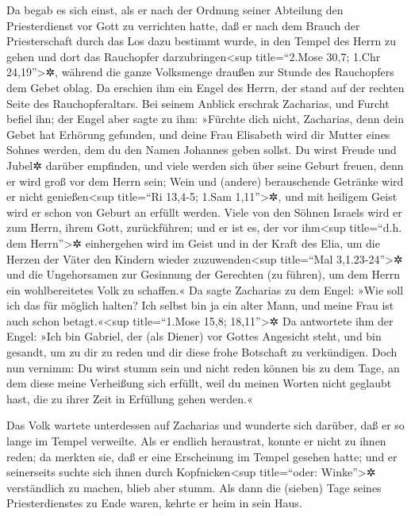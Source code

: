  Da begab es sich einst, als er nach der Ordnung seiner
Abteilung den Priesterdienst vor Gott zu verrichten hatte,
 daß er nach dem Brauch der Priesterschaft durch das Los
dazu bestimmt wurde, in den Tempel des Herrn zu gehen und dort das
Rauchopfer darzubringen\textless sup title=``2.Mose 30,7; 1.Chr
24,19''\textgreater✲,  während die ganze Volksmenge
draußen zur Stunde des Rauchopfers dem Gebet oblag.  Da
erschien ihm ein Engel des Herrn, der stand auf der rechten Seite des
Rauchopferaltars.  Bei seinem Anblick erschrak Zacharias,
und Furcht befiel ihn;  der Engel aber sagte zu ihm:
»Fürchte dich nicht, Zacharias, denn dein Gebet hat Erhörung gefunden,
und deine Frau Elisabeth wird dir Mutter eines Sohnes werden, dem du den
Namen Johannes geben sollst.  Du wirst Freude und Jubel✲
darüber empfinden, und viele werden sich über seine Geburt freuen,
 denn er wird groß vor dem Herrn sein; Wein und (andere)
berauschende Getränke wird er nicht genießen\textless sup title=``Ri
13,4-5; 1.Sam 1,11''\textgreater✲, und mit heiligem Geist wird er schon
von Geburt an erfüllt werden.  Viele von den Söhnen
Israels wird er zum Herrn, ihrem Gott, zurückführen;  und
er ist es, der vor ihm\textless sup title=``d.h. dem
Herrn''\textgreater✲ einhergehen wird im Geist und in der Kraft des
Elia, um die Herzen der Väter den Kindern wieder zuzuwenden\textless sup
title=``Mal 3,1.23-24''\textgreater✲ und die Ungehorsamen zur Gesinnung
der Gerechten (zu führen), um dem Herrn ein wohlbereitetes Volk zu
schaffen.«  Da sagte Zacharias zu dem Engel: »Wie soll
ich das für möglich halten? Ich selbst bin ja ein alter Mann, und meine
Frau ist auch schon betagt.«\textless sup title=``1.Mose 15,8;
18,11''\textgreater✲  Da antwortete ihm der Engel: »Ich
bin Gabriel, der (als Diener) vor Gottes Angesicht steht, und bin
gesandt, um zu dir zu reden und dir diese frohe Botschaft zu
verkündigen.  Doch nun vernimm: Du wirst stumm sein und
nicht reden können bis zu dem Tage, an dem diese meine Verheißung sich
erfüllt, weil du meinen Worten nicht geglaubt hast, die zu ihrer Zeit in
Erfüllung gehen werden.«

 Das Volk wartete unterdessen auf Zacharias und wunderte
sich darüber, daß er so lange im Tempel verweilte.  Als
er endlich heraustrat, konnte er nicht zu ihnen reden; da merkten sie,
daß er eine Erscheinung im Tempel gesehen hatte; und er seinerseits
suchte sich ihnen durch Kopfnicken\textless sup title=``oder:
Winke''\textgreater✲ verständlich zu machen, blieb aber stumm.
 Als dann die (sieben) Tage seines Priesterdienstes zu
Ende waren, kehrte er heim in sein Haus.

